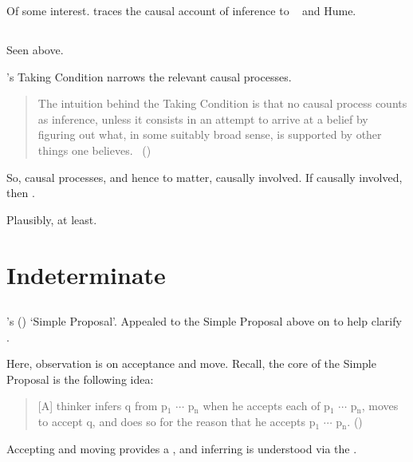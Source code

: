 \begin{note}
  Of some interest.
  \citeauthor{Armstrong:1968vh} traces the causal account of inference to ~\citeauthor{Moore:1962up} and Hume.
\end{note}

\subsection*{\textcite{Boghossian:2014aa}}

\begin{note}
  Seen above.

  \citeauthor{Boghossian:2014aa}'s Taking Condition narrows the relevant causal processes.

  \begin{quote}
    The intuition behind the Taking Condition is that no causal process counts as inference, unless it consists in an attempt to arrive at a belief by figuring out what, in some suitably broad sense, is supported by other things one believes.%
    \mbox{ }\hfill\mbox{(\citeyear[5]{Boghossian:2014aa})}
  \end{quote}

  So, causal processes, and hence to matter, causally involved.
  If causally involved, then \wit{}.
\end{note}

\begin{note}
  Plausibly, at least.

  
\end{note}

\section{Indeterminate}
\label{cha:lit:indeterminate}

\subsection*{\textcite{Wright:2014tt}}

\begin{note}
  \citeauthor{Wright:2014tt}'s (\citeyear{Wright:2014tt}) `Simple Proposal'.
  Appealed to the Simple Proposal above on  to help clarify \supportI{}.

  Here, observation is on acceptance and move.
  Recall, the core of the Simple Proposal is the following idea:

  \begin{quote}
    [A] thinker infers q from p\(_{1}\) \(\cdots\) p\(_{\text{n}}\) when he accepts each of p\(_{1}\) \(\cdots\) p\(_{\text{n}}\), moves to accept q, and does so for the reason that he accepts p\(_{1}\) \(\cdots\) p\(_{\text{n}}\).%
    \mbox{}\hfill\mbox{(\citeyear[33]{Wright:2014tt})}
  \end{quote}

  Accepting and moving provides a \wit{}, and inferring is understood via the \wit{}.
\end{note}

